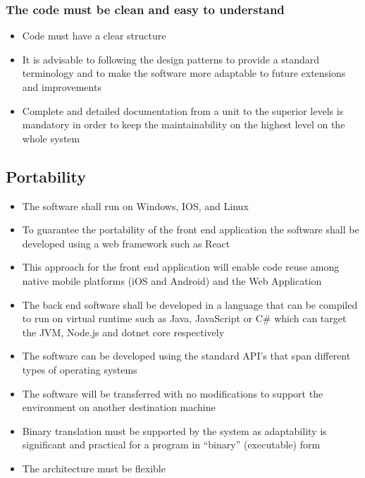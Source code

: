 \subsubsection{The code must be clean and easy to understand}
\begin{itemize}
  \item Code must have a clear structure
  \item It is advisable to following the design patterns to provide a standard terminology and to make the software more adaptable to future extensions and improvements
  \item Complete and detailed documentation from a unit to the superior levels is mandatory in order to keep the maintainability on the highest level on the whole system
\end{itemize}

\subsection{Portability}
\begin{itemize}
  \item The software shall run on Windows, IOS, and Linux
  \item To guarantee the portability of the front end application the software shall be developed using a web framework such as React
  \item This approach for the front end application will enable code reuse among native mobile platforms (iOS and Android) and the Web Application
  \item The back end software shall be developed in a language that can be compiled to run on virtual runtime such as Java, JavaScript or C# which can target the JVM, Node.js and dotnet core respectively
  \item The software can be developed using the standard API’s that span different types of operating systems
  \item The software will be transferred with no modifications to support the environment on another destination machine
  \item Binary translation must be supported by the system as adaptability is significant and practical for a program in “binary” (executable) form
  \item The architecture must be flexible
\end{itemize}
